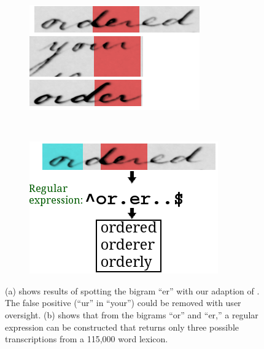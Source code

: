 \documentclass[conference]{IEEEtran}
\begin{document}
\begin{figure}
    \centering
    \begin{subfigure}[t]{0.23\textwidth}
    		\centering
    		\includegraphics[width=\textwidth]{er}
    		\caption{}%
    		\label{fig:spotting_ex}
    	\end{subfigure}
    	~
    	\begin{subfigure}[t]{0.23\textwidth}
    		\centering
    		\includegraphics[width=\textwidth]{regex}
    		\caption{}%
    		\label{fig:list}
    	\end{subfigure}
    	\caption{(a) shows results of spotting the bigram ``er'' with our adaption of \cite{Almazan2014}. The false positive (``ur'' in ``your'') could be removed with user oversight. (b) shows that from the bigrams ``or'' and ``er,'' a regular expression can be constructed that returns only three possible transcriptions from a 115,000 word lexicon.}
    	\label{fig:spotting}
\end{figure}
\end{document}
